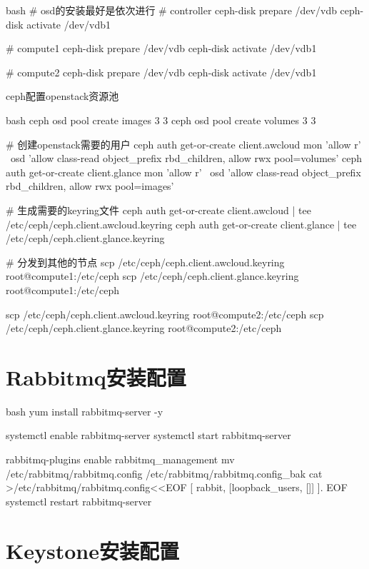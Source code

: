 \begin{outline}[enumerate]
\begin{code-in-enumerate}{bash}
# osd的安装最好是依次进行
# controller
ceph-disk prepare /dev/vdb
ceph-disk activate /dev/vdb1

# compute1
ceph-disk prepare /dev/vdb
ceph-disk activate /dev/vdb1

# compute2
ceph-disk prepare /dev/vdb
ceph-disk activate /dev/vdb1
\end{code-in-enumerate}

\1 ceph配置openstack资源池
\begin{code-in-enumerate}{bash}
ceph osd pool create images 3 3
ceph osd pool create volumes 3 3

# 创建openstack需要的用户
ceph auth get-or-create client.awcloud mon 'allow r' \
    osd 'allow class-read object_prefix rbd_children, allow rwx pool=volumes'
ceph auth get-or-create client.glance mon 'allow r' \
    osd 'allow class-read object_prefix rbd_children, allow rwx pool=images'

# 生成需要的keyring文件
ceph auth get-or-create client.awcloud | tee /etc/ceph/ceph.client.awcloud.keyring
ceph auth get-or-create client.glance | tee /etc/ceph/ceph.client.glance.keyring

# 分发到其他的节点
scp /etc/ceph/ceph.client.awcloud.keyring root@compute1:/etc/ceph
scp /etc/ceph/ceph.client.glance.keyring root@compute1:/etc/ceph

scp /etc/ceph/ceph.client.awcloud.keyring root@compute2:/etc/ceph
scp /etc/ceph/ceph.client.glance.keyring root@compute2:/etc/ceph
\end{code-in-enumerate}

\end{outline}

\section{Rabbitmq安装配置}
\label{section:rabbitmq_configuration}
\begin{code-block}{bash}
yum install rabbitmq-server -y

systemctl enable rabbitmq-server
systemctl start rabbitmq-server

rabbitmq-plugins enable rabbitmq_management
mv /etc/rabbitmq/rabbitmq.config /etc/rabbitmq/rabbitmq.config_bak
cat >/etc/rabbitmq/rabbitmq.config<<EOF
[
{rabbit, [{loopback_users, []}]}
].
EOF
systemctl restart rabbitmq-server
\end{code-block}

\section{Keystone安装配置}




